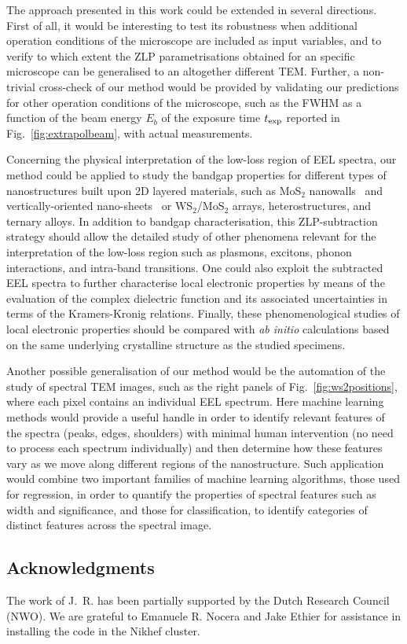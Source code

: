 The approach presented in this work could be extended
in several directions.
%
First of all, it would be interesting to test its robustness when additional
operation conditions of the microscope are included as input variables,
and to verify to which extent the ZLP parametrisations obtained for an specific microscope
can be generalised to an altogether different TEM.
%
Further, a non-trivial cross-check of our method would be provided by validating
our predictions for other operation conditions of the microscope, such
as the FWHM as a function of the beam energy $E_b$ of the exposure time
$t_{\rm exp}$ reported in Fig.~\ref{fig:extrapolbeam},
with actual measurements.

Concerning the physical interpretation of the low-loss region of EEL
spectra, our method could be applied to study the bandgap properties 
for different types
of nanostructures built upon 2D layered materials, such as MoS$_2$ nanowalls~\cite{nanowalls}
and 
vertically-oriented nano-sheets~\cite{D0NR00755B} or
WS$_2$/MoS$_2$ arrays, heterostructures, and ternary alloys.
%
In addition to bandgap characterisation, this ZLP-subtraction
strategy should allow the detailed study
of other phenomena relevant for the interpretation of the low-loss
region such as  plasmons, excitons, phonon interactions, and
intra-band transitions.
%
One could also exploit the subtracted EEL spectra to further characterise
local electronic properties by means of the
 evaluation of the complex dielectric function and its associated
uncertainties in terms of the Kramers-Kronig relations.
%
Finally, these phenomenological studies of local electronic properties should be compared
with {\it ab initio} calculations based
on the same underlying crystalline structure as the studied specimens.

Another possible generalisation of our method would be the automation of
the study of spectral TEM images,
such as the right panels of Fig.~\ref{fig:ws2positions},
where each pixel contains an individual EEL spectrum.
%
Here machine learning methods would provide a  useful handle in order
to identify relevant features of the spectra (peaks, edges, shoulders) with minimal
human intervention (no need to process each spectrum individually) and then determine
how these features vary as we move along different regions of the
nanostructure.
%
Such application would combine two important families of machine learning algorithms,
those used for regression, in order to quantify the properties of spectral
features such as width and significance, and those for classification, to identify categories
of distinct features across the spectral image.

\subsection*{Acknowledgments}
%
The work of J.~R. has been partially supported by the
Dutch Research Council (NWO).
%
We are grateful to Emanuele R. Nocera and Jake Ethier for
assistance in installing the code in the Nikhef cluster.
